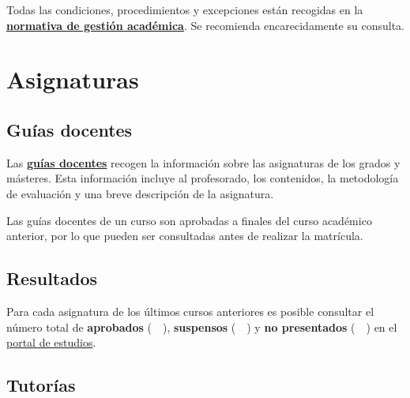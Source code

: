 \begin{importantBox}
    Todas las condiciones, procedimientos y excepciones están recogidas en la \href{https://www.udc.es/gl/normativa/academica/}{\textbf{normativa de gestión académica}}. Se recomienda encarecidamente su consulta.
\end{importantBox}


\section{Asignaturas}

\subsection{Guías docentes}

Las \href{https://guiadocente.udc.es/guia_docent/index.php?centre=614&ensenyament=614G01&consulta=assignatures&idioma=cast}{\textbf{guías docentes}} recogen la información sobre las asignaturas de los grados y másteres. Esta información incluye al profesorado, los contenidos, la metodología de evaluación y una breve descripción de la asignatura.  

\begin{curiosityBox}
    Las guías docentes de un curso son aprobadas a finales del curso académico anterior, por lo que pueden ser consultadas antes de realizar la matrícula.
\end{curiosityBox}

\subsection{Resultados}

Para cada asignatura de los últimos cursos anteriores es posible consultar el número total de \textbf{aprobados} (~\textcolor{resultPassed}{}~), \textbf{suspensos} (~\textcolor{resultFailed}{}~) y \textbf{no presentados} (~\textcolor{resultNotPresented}{}~) en el \href{\linkPortalEstudos}{portal de estudios}.

\FloatBarrier
\begin{figure}[htp]
    \centering
\end{figure}
\FloatBarrier

\subsection{Tutorías} 


